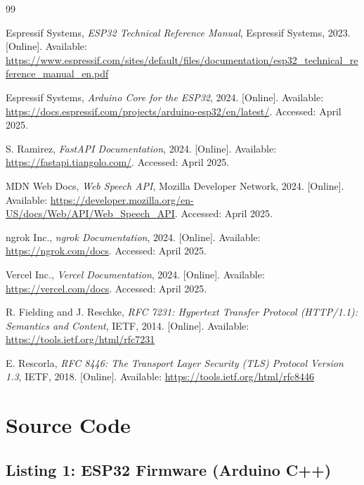 \documentclass[12pt]{report}
\begin{document}
\begin{thebibliography}{99}

Espressif Systems,
\textit{ESP32 Technical Reference Manual},
Espressif Systems, 2023.
[Online]. Available:
\url{https://www.espressif.com/sites/default/files/documentation/esp32_technical_reference_manual_en.pdf}

Espressif Systems,
\textit{Arduino Core for the ESP32},
2024.
[Online]. Available: \url{https://docs.espressif.com/projects/arduino-esp32/en/latest/}.
Accessed: April 2025.

S. Ramirez,
\textit{FastAPI Documentation},
2024.
[Online]. Available: \url{https://fastapi.tiangolo.com/}.
Accessed: April 2025.

MDN Web Docs,
\textit{Web Speech API},
Mozilla Developer Network, 2024.
[Online]. Available:
\url{https://developer.mozilla.org/en-US/docs/Web/API/Web_Speech_API}.
Accessed: April 2025.

ngrok Inc.,
\textit{ngrok Documentation},
2024.
[Online]. Available: \url{https://ngrok.com/docs}.
Accessed: April 2025.

Vercel Inc.,
\textit{Vercel Documentation},
2024.
[Online]. Available: \url{https://vercel.com/docs}.
Accessed: April 2025.

R. Fielding and J. Reschke,
\textit{RFC 7231: Hypertext Transfer Protocol (HTTP/1.1): Semantics and Content},
IETF, 2014.
[Online]. Available: \url{https://tools.ietf.org/html/rfc7231}

E. Rescorla,
\textit{RFC 8446: The Transport Layer Security (TLS) Protocol Version 1.3},
IETF, 2018.
[Online]. Available: \url{https://tools.ietf.org/html/rfc8446}

\end{thebibliography}

\newpage
\chapter*{Source Code}

\section*{Listing 1: ESP32 Firmware (Arduino C++)}
\end{document}
